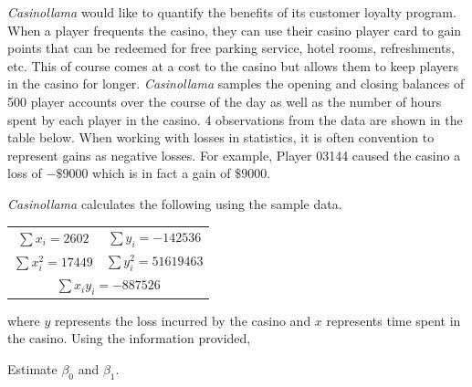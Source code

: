 \begin{example}
\textit{Casinollama} would like to quantify the benefits of its customer loyalty program. When a player frequents the casino, they can use their casino player card to gain points that can be redeemed for free parking service, hotel rooms, refreshments, etc. This of course comes at a cost to the casino but allows them to keep players in the casino for longer. \textit{Casinollama} samples the opening and closing balances of 500 player accounts over the course of the day as well as the number of hours spent by each player in the casino. 4 observations from the data are shown in the table below. When working with losses in statistics, it is often convention to represent gains as negative losses. For example, Player 03144 caused the casino a loss of $-\$9000$ which is in fact a gain of $\$9000$.
\begin{center}
\def\arraystretch{1.5}
\end{center} 
\textit{Casinollama} calculates the following using the sample data.
\begin{center}
\begin{tabular}{cc}

$\sum x_i = 2602$ & $\sum y_i = -142536$ \\ 

$\sum x_i^2 = 17449$ & $\sum y_i^2 = 51619463$ \\ 

\multicolumn{2}{c}{$\sum x_i y_i = -887526$} \\ 

\end{tabular} 
\end{center}
where $y$ represents the loss incurred by the casino and $x$ represents time spent in the casino.
Using the information provided,
\begin{benumerate}
\item Estimate $\beta_0$ and $\beta_1$.


\end{benumerate}
\end{example}
